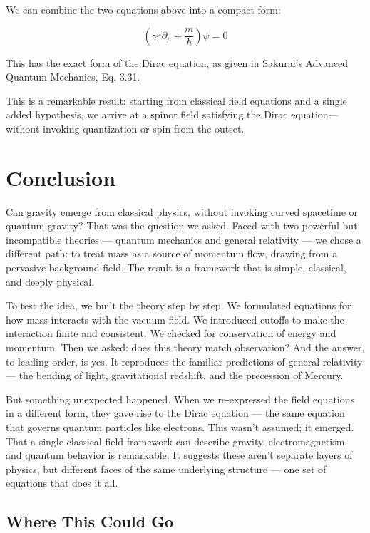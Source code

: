 \documentclass {article}
\begin{document}
We can combine the two equations above into a compact form:

\begin{equation}
\left( \gamma^\mu \partial_\mu + \frac{m}{\hbar} \right) \psi = 0
\end{equation}

This has the exact form of the Dirac equation, as given in Sakurai’s Advanced Quantum Mechanics, Eq. 3.31.

This is a remarkable result: starting from classical field equations and a single added hypothesis, we arrive at a spinor field satisfying the Dirac equation—without invoking quantization or spin from the outset. 


\section{Conclusion}

Can gravity emerge from classical physics, without invoking curved spacetime or quantum gravity? That was the question we asked. Faced with two powerful but incompatible theories — quantum mechanics and general relativity — we chose a different path: to treat mass as a source of momentum flow, drawing from a pervasive background field. The result is a framework that is simple, classical, and deeply physical.

To test the idea, we built the theory step by step. We formulated equations for how mass interacts with the vacuum field. We introduced cutoffs to make the interaction finite and consistent. We checked for conservation of energy and momentum. Then we asked: does this theory match observation? And the answer, to leading order, is yes. It reproduces the familiar predictions of general relativity — the bending of light, gravitational redshift, and the precession of Mercury.

But something unexpected happened. When we re-expressed the field equations in a different form, they gave rise to the Dirac equation — the same equation that governs quantum particles like electrons. This wasn’t assumed; it emerged. That a single classical field framework can describe gravity, electromagnetism, and quantum behavior is remarkable. It suggests these aren’t separate layers of physics, but different faces of the same underlying structure — one set of equations that does it all.


\subsection{Where This Could Go}
\end{document}

